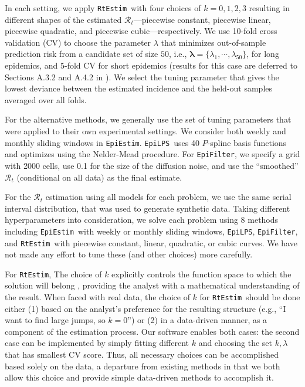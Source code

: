 \documentclass[10pt,letterpaper]{article}
\def\RtEstim{\texttt{RtEstim}}
\def\EpiEstim{\texttt{EpiEstim}}
\def\EpiLPS{\texttt{EpiLPS}}
\def\EpiFilter{\texttt{EpiFilter}}
\def\calR{\mathcal{R}}
\begin{document}
In each setting, we apply \RtEstim\ with four choices of $k=0,1, 2, 3$ resulting
in different shapes of the estimated $\calR_t$---piecewise constant, piecewise
linear, piecewise quadratic, and piecewise cubic---respectively. We use 10-fold
cross validation (CV) to choose the parameter $\lambda$ that minimizes
out-of-sample prediction risk from a candidate set of size $50$, i.e.,
$\boldsymbol{\lambda} = \{\lambda_1, \cdots, \lambda_{50}\}$, for long
epidemics, and $5$-fold CV for short epidemics (results for this case are
deferred to Sections A.3.2 and A.4.2 in ). We select the tuning
parameter that gives the lowest deviance between the estimated
incidence and the held-out samples averaged over all folds. 

For the alternative methods, we generally use the set of tuning parameters that
were applied to their own experimental settings. We consider both weekly and
monthly sliding windows in \EpiEstim. \EpiLPS\ uses 40 $P$-spline basis
functions and optimizes using the Nelder-Mead procedure. For \EpiFilter, we
specify a grid with 2000 cells, use 0.1 for the size of the diffusion noise, and
use the ``smoothed'' $\calR_t$ (conditional on all data) as the final estimate. 

For the $\calR_t$ estimation using all models for each problem, we use the same
serial interval distribution, that was used to generate synthetic data. Taking
different hyperparameters into consideration, we solve each problem using 8
methods including \EpiEstim\ with weekly or monthly sliding windows, \EpiLPS,
\EpiFilter, and \RtEstim\ with piecewise constant, linear, quadratic, or cubic
curves. We have not made any effort to tune these (and other choices) more
carefully.

For \RtEstim, The choice of $k$ explicitly controls the function space to which
the solution will belong \cite{tibshirani2022divided}, providing the analyst
with a mathematical understanding of the result. When faced with real data, the
choice of $k$ for \RtEstim\ should be done either (1) based on the analyst's
preference for the resulting structure (e.g., ``I want to find large jumps, so
$k=0$'') or (2) in a data-driven manner, as a component of the estimation
process.  Our software enables both cases: the second case can be implemented by
simply fitting different $k$ and choosing the set $k,\lambda$ that has smallest
CV score. Thus, all necessary choices can be accomplished based solely on the
data, a departure from existing methods in that we both allow this choice and
provide simple data-driven methods to accomplish it.
\end{document}
